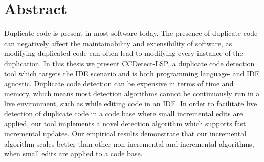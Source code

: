 \chapter*{Abstract} 

Duplicate code is present in most software today. The presence of duplicate code can
negatively affect the maintainability and extensibility of software, as modifying
duplicated code can often lead to modifying every instance of the duplication. In this
thesis we present CCDetect\nobreakdash-LSP, a duplicate code detection tool which targets
the IDE scenario and is both programming language- and IDE agnostic. Duplicate code
detection can be expensive in terms of time and memory, which means most detection
algorithms cannot be continuously run in a live environment, such as while editing code in
an IDE. In order to facilitate live detection of duplicate code in a code base where small
incremental edits are applied, our tool implements a novel detection algorithm which
supports fast incremental updates. Our empirical results demonstrate that our incremental
algorithm scales better than other non-incremental and incremental algorithms, when small
edits are applied to a code base.
